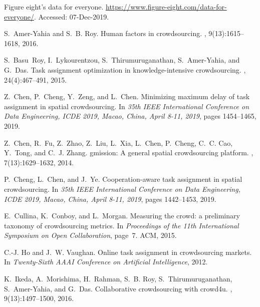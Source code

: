 \documentclass[11pt]{article}
\begin{document}

\begin{thebibliography}{10}
	
	Figure eight's data for everyone.
	\newblock \url{https://www.figure-eight.com/data-for-everyone/}.
	\newblock Accessed: 07-Dec-2019.
	
	S.~Amer-Yahia and S.~B. Roy.
	\newblock Human factors in crowdsourcing.
	, 9(13):1615--1618, 2016.
	
	S.~Basu~Roy, I.~Lykourentzou, S.~Thirumuruganathan, S.~Amer-Yahia, and G.~Das.
	\newblock Task assignment optimization in knowledge-intensive crowdsourcing.
	, 24(4):467--491, 2015.
	
	Z.~Chen, P.~Cheng, Y.~Zeng, and L.~Chen.
	\newblock Minimizing maximum delay of task assignment in spatial crowdsourcing.
	\newblock In {\em 35th {IEEE} International Conference on Data Engineering,
		{ICDE} 2019, Macao, China, April 8-11, 2019}, pages 1454--1465, 2019.
	
	Z.~Chen, R.~Fu, Z.~Zhao, Z.~Liu, L.~Xia, L.~Chen, P.~Cheng, C.~C. Cao, Y.~Tong,
	and C.~J. Zhang.
	\newblock gmission: {A} general spatial crowdsourcing platform.
	, 7(13):1629--1632, 2014.
	
	P.~Cheng, L.~Chen, and J.~Ye.
	\newblock Cooperation-aware task assignment in spatial crowdsourcing.
	\newblock In {\em 35th {IEEE} International Conference on Data Engineering,
		{ICDE} 2019, Macao, China, April 8-11, 2019}, pages 1442--1453, 2019.
	
	E.~Cullina, K.~Conboy, and L.~Morgan.
	\newblock Measuring the crowd: a preliminary taxonomy of crowdsourcing metrics.
	\newblock In {\em Proceedings of the 11th International Symposium on Open
		Collaboration}, page~7. ACM, 2015.
	
	C.-J. Ho and J.~W. Vaughan.
	\newblock Online task assignment in crowdsourcing markets.
	\newblock In {\em Twenty-Sixth AAAI Conference on Artificial Intelligence},
	2012.
	
	K.~Ikeda, A.~Morishima, H.~Rahman, S.~B. Roy, S.~Thirumuruganathan,
	S.~Amer-Yahia, and G.~Das.
	\newblock Collaborative crowdsourcing with crowd4u.
	, 9(13):1497--1500, 2016.
	

\end{thebibliography}
\end{document}
